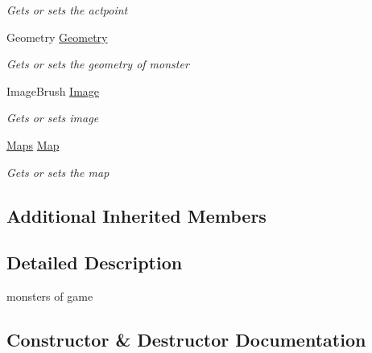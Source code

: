 \begin{DoxyCompactItemize}
\begin{DoxyCompactList}\small\item\em Gets or sets the actpoint \end{DoxyCompactList}\item 
Geometry \hyperlink{class_lightdeath_1_1_monsters_a6ea9fb91a6b87941e4521504da3a2aa4}{Geometry}
\begin{DoxyCompactList}\small\item\em Gets or sets the geometry of monster \end{DoxyCompactList}\item 
Image\+Brush \hyperlink{class_lightdeath_1_1_monsters_a6b01d464532c72ecf49b52f2cd35765d}{Image}
\begin{DoxyCompactList}\small\item\em Gets or sets image \end{DoxyCompactList}\item 
\hyperlink{class_lightdeath_1_1_maps}{Maps} \hyperlink{class_lightdeath_1_1_monsters_ad7bda2bbfa131286ad87602ac324ebd3}{Map}
\begin{DoxyCompactList}\small\item\em Gets or sets the map \end{DoxyCompactList}\end{DoxyCompactItemize}
\subsection*{Additional Inherited Members}


\subsection{Detailed Description}
monsters of game 



\subsection{Constructor \& Destructor Documentation}
\hypertarget{class_lightdeath_1_1_monsters_acd2560c5b318a1466901c4637a8565ac}{}\label{class_lightdeath_1_1_monsters_acd2560c5b318a1466901c4637a8565ac} 
